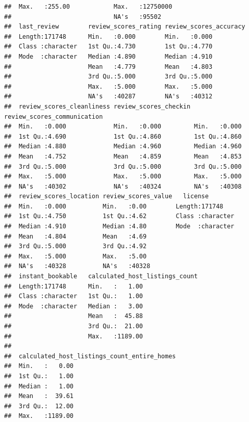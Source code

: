 \documentclass[
]{article}
\begin{document}
\begin{verbatim}
##  Max.   :255.00            Max.   :12750000                          
##                            NA's   :95502                             
##  last_review        review_scores_rating review_scores_accuracy
##  Length:171748      Min.   :0.000        Min.   :0.000         
##  Class :character   1st Qu.:4.730        1st Qu.:4.770         
##  Mode  :character   Median :4.890        Median :4.910         
##                     Mean   :4.779        Mean   :4.803         
##                     3rd Qu.:5.000        3rd Qu.:5.000         
##                     Max.   :5.000        Max.   :5.000         
##                     NA's   :40287        NA's   :40312         
##  review_scores_cleanliness review_scores_checkin review_scores_communication
##  Min.   :0.000             Min.   :0.000         Min.   :0.000              
##  1st Qu.:4.690             1st Qu.:4.860         1st Qu.:4.860              
##  Median :4.880             Median :4.960         Median :4.960              
##  Mean   :4.752             Mean   :4.859         Mean   :4.853              
##  3rd Qu.:5.000             3rd Qu.:5.000         3rd Qu.:5.000              
##  Max.   :5.000             Max.   :5.000         Max.   :5.000              
##  NA's   :40302             NA's   :40324         NA's   :40308              
##  review_scores_location review_scores_value   license         
##  Min.   :0.000          Min.   :0.00        Length:171748     
##  1st Qu.:4.750          1st Qu.:4.62        Class :character  
##  Median :4.910          Median :4.80        Mode  :character  
##  Mean   :4.804          Mean   :4.69                          
##  3rd Qu.:5.000          3rd Qu.:4.92                          
##  Max.   :5.000          Max.   :5.00                          
##  NA's   :40328          NA's   :40328                         
##  instant_bookable   calculated_host_listings_count
##  Length:171748      Min.   :   1.00               
##  Class :character   1st Qu.:   1.00               
##  Mode  :character   Median :   3.00               
##                     Mean   :  45.88               
##                     3rd Qu.:  21.00               
##                     Max.   :1189.00               
##                                                   
##  calculated_host_listings_count_entire_homes
##  Min.   :   0.00                            
##  1st Qu.:   1.00                            
##  Median :   1.00                            
##  Mean   :  39.61                            
##  3rd Qu.:  12.00                            
##  Max.   :1189.00                            

\end{verbatim}
\end{document}
